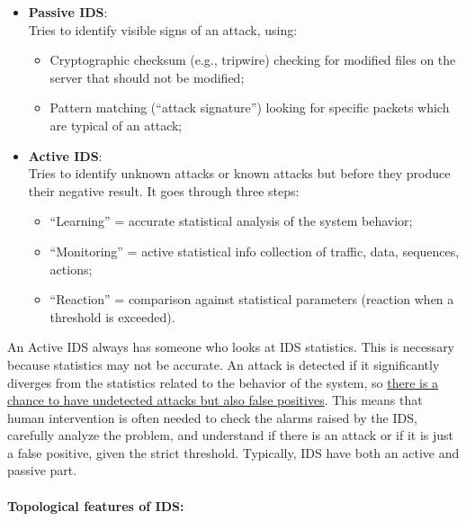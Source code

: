 \begin{itemize}
    \item \textbf{Passive IDS}:\\
          Tries to identify visible signs of an attack, using:
          \begin{itemize}
              \item Cryptographic checksum (e.g., tripwire) checking for modified files on the server that should not be modified;
              \item Pattern matching (“attack signature”) looking for specific packets which are typical of an attack;
          \end{itemize}

    \item \textbf{Active IDS}:\\
          Tries to identify unknown attacks or known attacks but before they produce their negative result. It goes through three steps:
          \begin{itemize}
              \item “Learning” = accurate statistical analysis of the system behavior;
              \item “Monitoring” = active statistical info collection of traffic, data, sequences, actions;
              \item “Reaction” = comparison against statistical parameters (reaction when a threshold is exceeded).
          \end{itemize}
\end{itemize}

An Active IDS always has someone who looks at IDS statistics. This is necessary because statistics may not be accurate. An attack is detected if it significantly diverges from the statistics related to the behavior of the system, so \ul{there is a chance to have undetected attacks but also false positives}. This means that human intervention is often needed to check the alarms raised by the IDS, carefully analyze the problem, and understand if there is an attack or if it is just a false positive, given the strict threshold. Typically, IDS have both an active and passive part.

\paragraph{Topological features of IDS:}

